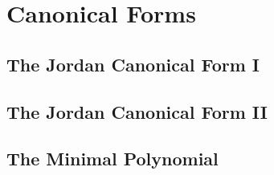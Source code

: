 \setcounter{chapter}{6}
\chapter{Canonical Forms}

\section{The Jordan Canonical Form I}



\vspace{12pt}

\setcounter{Exercise}{2}


\vspace{12pt}

\setcounter{Exercise}{12}



\section{The Jordan Canonical Form II}



\vspace{12pt}

\setcounter{Exercise}{3}


\vspace{12pt}



\vspace{12pt}




\section{The Minimal Polynomial}



\vspace{12pt}



\vspace{12pt}



\vspace{12pt}



\vspace{12pt}

\setcounter{Exercise}{4}



